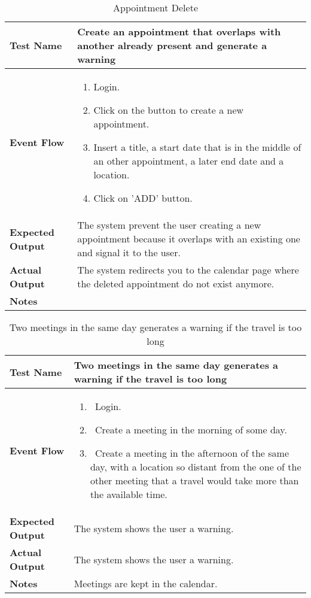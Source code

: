 \begin{table}[h]	
	\centering
	\def\arraystretch{1.5}
	\begin{tabular}{|m{7cm}|m{7cm}|}
		\hline
		\textbf{Test Name}            & Create an appointment that overlaps with another already present and generate a warning  \\ \hline
		\textbf{Event Flow}             & 
		\begin{enumerate}
			\item Login.
			\item Click on the button to create a new appointment.
			\item Insert a title, a start date that is in the middle of an other appointment, a later end date and a location.
			\item Click on 'ADD' button.
		\end{enumerate} \\ \hline
		\textbf{Expected Output}  &  The system prevent the user creating a new appointment because it overlaps with an existing one and signal it to the user.  \\ \hline
		\textbf{Actual Output}       & The system redirects you to the calendar page where the deleted appointment do not exist anymore.    \\ \hline
		\textbf{Notes} & \\ \hline
	\end{tabular}
	\caption{Appointment Delete}
\end{table}


\begin{table}[h]	
\centering
\def\arraystretch{1.5}
\begin{tabular}{|m{7cm}|m{7cm}|}
	\hline
	\textbf{Test Name}            &  Two meetings in the same day generates a warning if the travel is too long  \\ \hline
	\textbf{Event Flow}             &   
		\begin{enumerate}
			\item~Login.
			\item~Create a meeting in the morning of some day.
			\item~Create a meeting in the afternoon of the same day, with a location so distant from the one of the other meeting that a travel would take more than the available time.
		\end{enumerate}
	\\ \hline
	\textbf{Expected Output}  &  The system shows the user a warning.   \\ \hline
	\textbf{Actual Output}       &   The system shows the user a warning.  \\ \hline
	\textbf{Notes} &  Meetings are kept in the calendar.   \\ \hline
\end{tabular}
\caption{Two meetings in the same day generates a warning if the travel is too long}
\end{table}


